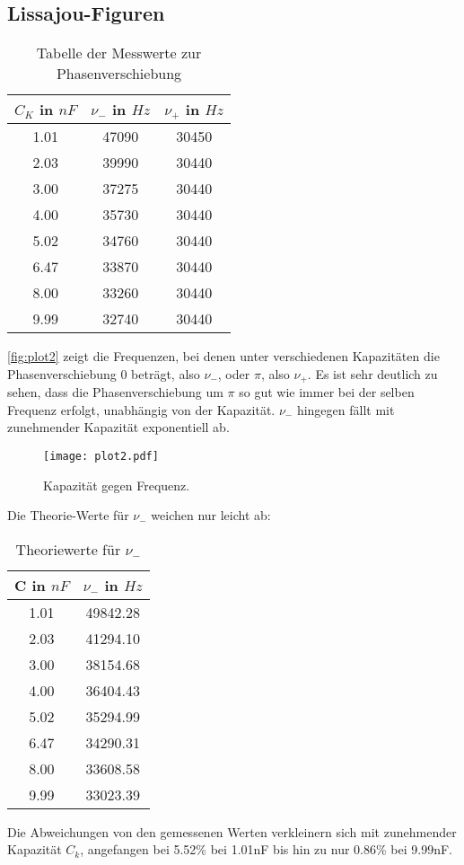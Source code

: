 \subsection{Lissajou-Figuren}

\begin{table}
  \centering
  \caption{Tabelle der Messwerte zur Phasenverschiebung}
  \label{tab:tab2}
  \begin{tabular}{c c c}
    \toprule
    \(C_K\) in $nF$ & \(\nu_-\) in $Hz$ & \(\nu_+\) in $Hz$\\
    \midrule
    1.01 & 47090 & 30450\\
    2.03 & 39990 & 30440\\
    3.00 & 37275 & 30440\\
    4.00 & 35730 & 30440\\
    5.02 & 34760 & 30440\\
    6.47 & 33870 & 30440\\
    8.00 & 33260 & 30440\\
    9.99 & 32740 & 30440\\
    \bottomrule
  \end{tabular}
\end{table}

\autoref{fig:plot2} zeigt die Frequenzen, bei denen unter verschiedenen Kapazitäten die Phasenverschiebung 0 beträgt, also \(\nu_-\), oder \(\pi\), also \(\nu_+\).
Es ist sehr deutlich zu sehen, dass die Phasenverschiebung um \(\pi\) so gut wie immer bei der selben Frequenz erfolgt, unabhängig von der Kapazität.
\(\nu_-\) hingegen fällt mit zunehmender Kapazität exponentiell ab.
\begin{figure}
  \centering
  \texttt{[image: plot2.pdf]}
  \caption{Kapazität gegen Frequenz.}
  \label{fig:plot2}
\end{figure}
\newpage
Die Theorie-Werte für \(\nu_-\) weichen nur leicht ab:
\\
\begin{table}
  \centering
  \caption{Theoriewerte für \(\nu_-\)}
  \label{tab:tab3}
  \begin{tabular}{c c}
    \toprule
    C in \(nF\) & \(\nu_-\) in \(Hz\)\\
    \midrule
    1.01 & 49842.28\\
    2.03 & 41294.10\\
    3.00 & 38154.68\\
    4.00 & 36404.43\\
    5.02 & 35294.99\\
    6.47 & 34290.31\\
    8.00 & 33608.58\\
    9.99 & 33023.39\\
  \end{tabular}
\end{table}
Die Abweichungen von den gemessenen Werten verkleinern sich mit zunehmender Kapazität \(C_k\), angefangen bei 5.52\% bei 1.01nF bis hin zu nur 0.86\% bei 9.99nF.
\newpage
